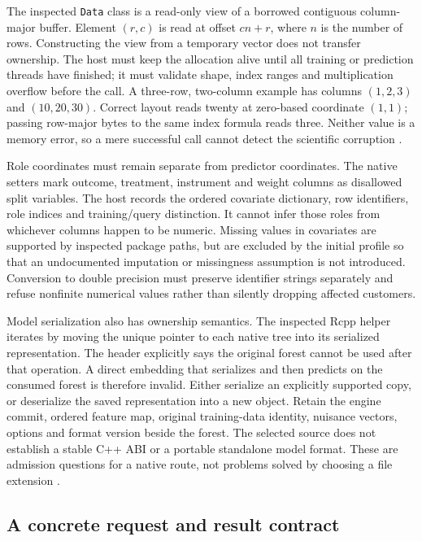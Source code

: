 The inspected \texttt{Data} class is a read-only view of a borrowed
contiguous column-major buffer. Element \((r,c)\) is read at offset
\(cn+r\), where \(n\) is the number of rows. Constructing the view from
a temporary vector does not transfer ownership. The host must keep the
allocation alive until all training or prediction threads have finished;
it must validate shape, index ranges and multiplication overflow before
the call. A three-row, two-column example has columns \((1,2,3)\) and
\((10,20,30)\). Correct layout reads twenty at zero-based coordinate
\((1,1)\); passing row-major bytes to the same index formula reads
three. Neither value is a memory error, so a mere successful call cannot
detect the scientific corruption
\citep{exec13_grf_memory,exec13_grf_oracle}.

Role coordinates must remain separate from predictor coordinates. The
native setters mark outcome, treatment, instrument and weight columns as
disallowed split variables. The host records the ordered covariate
dictionary, row identifiers, role indices and training/query
distinction. It cannot infer those roles from whichever columns happen
to be numeric. Missing values in covariates are supported by inspected
package paths, but are excluded by the initial profile so that an
undocumented imputation or missingness assumption is not introduced.
Conversion to double precision must preserve identifier strings
separately and refuse nonfinite numerical values rather than silently
dropping affected customers.

Model serialization also has ownership semantics. The inspected Rcpp
helper iterates by moving the unique pointer to each native tree into
its serialized representation. The header explicitly says the original
forest cannot be used after that operation. A direct embedding that
serializes and then predicts on the consumed forest is therefore
invalid. Either serialize an explicitly supported copy, or deserialize
the saved representation into a new object. Retain the engine commit,
ordered feature map, original training-data identity, nuisance vectors,
options and format version beside the forest. The selected source does
not establish a stable C++ ABI or a portable standalone model format.
These are admission questions for a native route, not problems solved by
choosing a file extension \citep{exec13_grf_memory}.

\subsection{A concrete request and result contract}

